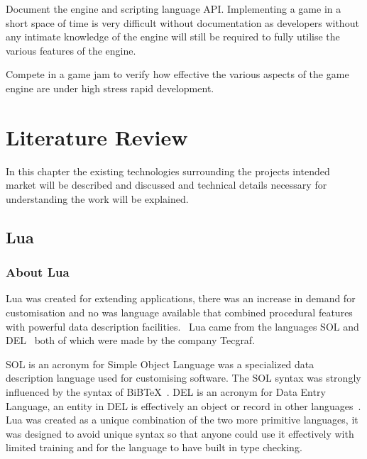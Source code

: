 \documentclass[11pt,a4paper,titlepage]{report}
\begin{document}
	Document the engine and scripting language API. Implementing a game in a short space of time is very difficult without documentation as developers without any intimate knowledge of the engine will still be required to fully utilise the various features of the engine.

	Compete in a game jam to verify how effective the various aspects of the game engine are under high stress rapid development.
	
\newpage










	
\chapter{Literature Review}


	In this chapter the existing technologies surrounding the projects intended market will be described and discussed and technical details necessary for understanding the work will be explained.

\section{Lua}
\subsection{About Lua}
	Lua was created for extending applications, there was an increase in demand for customisation and no was language available that combined procedural features with powerful data description facilities.~\cite{Ierusalimschy02software} Lua came from the languages SOL and DEL~\cite{Ierusalimschy01theevolution} both of which were made by the company Tecgraf.
	
	SOL is an acronym for Simple Object Language was a specialized data description language used for customising software. The SOL syntax was strongly influenced by the syntax of BiBTeX~\cite{Lamport:1989:LDP:63364}. DEL is an acronym for Data Entry Language, an entity in DEL is effectively an object or record in other languages~\cite{Ierusalimschy01theevolution}. Lua was created as a unique combination of the two more primitive languages, it was designed to avoid unique syntax so that anyone could use it effectively with limited training and for the language to have built in type checking.
	
\end{document}

